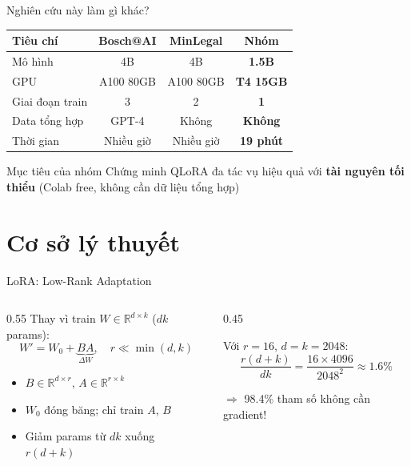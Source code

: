 \documentclass{beamer}
\begin{document}
\begin{frame}{Nghiên cứu này làm gì khác?}
  \begin{table}
    \centering
    \small
    \begin{tabular}{lccc}
      \toprule
      \textbf{Tiêu chí} & \textbf{Bosch@AI} & \textbf{MinLegal} & \textbf{Nhóm} \\
      \midrule
      Mô hình & 4B & 4B & \textbf{1.5B} \\
      GPU & A100 80GB & A100 80GB & \textbf{T4 15GB} \\
      Giai đoạn train & 3 & 2 & \textbf{1} \\
      Data tổng hợp & GPT-4 & Không & \textbf{Không} \\
      Thời gian & Nhiều giờ & Nhiều giờ & \textbf{19 phút} \\
      \bottomrule
    \end{tabular}
  \end{table}
  \vspace{0.3cm}
  \begin{alertblock}{Mục tiêu của nhóm}
    Chứng minh QLoRA đa tác vụ hiệu quả với \textbf{tài nguyên tối thiểu}
    (Colab free, không cần dữ liệu tổng hợp)
  \end{alertblock}
\end{frame}

\section{Cơ sở lý thuyết}

\begin{frame}{LoRA: Low-Rank Adaptation}
  \begin{columns}
    \begin{column}{0.55\textwidth}
      Thay vì train $W \in \mathbb{R}^{d \times k}$ ($dk$ params):
      \[W' = W_0 + \underbrace{BA}_{\Delta W}, \quad r \ll \min(d,k)\]
      \begin{itemize}
        \item $B \in \mathbb{R}^{d \times r}$, $A \in \mathbb{R}^{r \times k}$
        \item $W_0$ đóng băng; chỉ train $A$, $B$
        \item Giảm params từ $dk$ xuống $r(d+k)$
      \end{itemize}
    \end{column}
    \begin{column}{0.45\textwidth}
      \begin{block}{Với $r=16$, $d=k=2048$:}
        \[
          \frac{r(d+k)}{dk} = \frac{16 \times 4096}{2048^2} \approx 1.6\%
        \]
      \end{block}
      \vspace{0.2cm}
      $\Rightarrow$ 98.4\% tham số không cần gradient!
    \end{column}
  \end{columns}
\end{frame}
\end{document}
